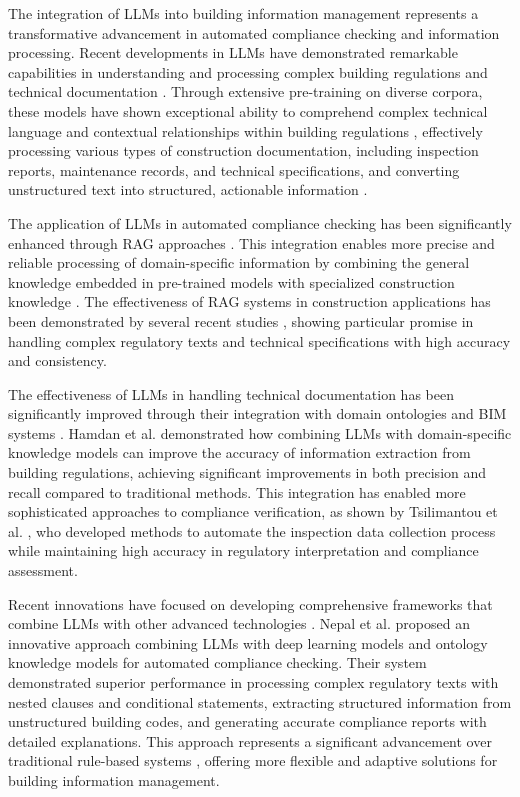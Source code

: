 \documentclass[a4paper,fleqn]{cas-sc}
\begin{document}
The integration of LLMs into building information management represents a transformative advancement in automated compliance checking and information processing. Recent developments in LLMs have demonstrated remarkable capabilities in understanding and processing complex building regulations and technical documentation \cite{chen2023automated}. Through extensive pre-training on diverse corpora, these models have shown exceptional ability to comprehend complex technical language and contextual relationships within building regulations \cite{brown2020language}, effectively processing various types of construction documentation, including inspection reports, maintenance records, and technical specifications, and converting unstructured text into structured, actionable information \cite{gao2023survey}.

The application of LLMs in automated compliance checking has been significantly enhanced through RAG approaches \cite{lewis2020retrieval, fan2023retrieval}. This integration enables more precise and reliable processing of domain-specific information by combining the general knowledge embedded in pre-trained models with specialized construction knowledge \cite{fan2023retrieval}. The effectiveness of RAG systems in construction applications has been demonstrated by several recent studies \cite{asai2023self, wang2023augmented}, showing particular promise in handling complex regulatory texts and technical specifications with high accuracy and consistency.

The effectiveness of LLMs in handling technical documentation has been significantly improved through their integration with domain ontologies and BIM systems \cite{bruno2018historic, ismail2021how}. Hamdan et al. \cite{hamdan2021semantic} demonstrated how combining LLMs with domain-specific knowledge models can improve the accuracy of information extraction from building regulations, achieving significant improvements in both precision and recall compared to traditional methods. This integration has enabled more sophisticated approaches to compliance verification, as shown by Tsilimantou et al. \cite{tsilimantou2020gis}, who developed methods to automate the inspection data collection process while maintaining high accuracy in regulatory interpretation and compliance assessment.

Recent innovations have focused on developing comprehensive frameworks that combine LLMs with other advanced technologies \cite{zhang2022integrating, chen2021geo}. Nepal et al. \cite{nepal2021towards} proposed an innovative approach combining LLMs with deep learning models and ontology knowledge models for automated compliance checking. Their system demonstrated superior performance in processing complex regulatory texts with nested clauses and conditional statements, extracting structured information from unstructured building codes, and generating accurate compliance reports with detailed explanations. This approach represents a significant advancement over traditional rule-based systems \cite{ribeiro2020remote, tan2021automatic}, offering more flexible and adaptive solutions for building information management.
\end{document}
